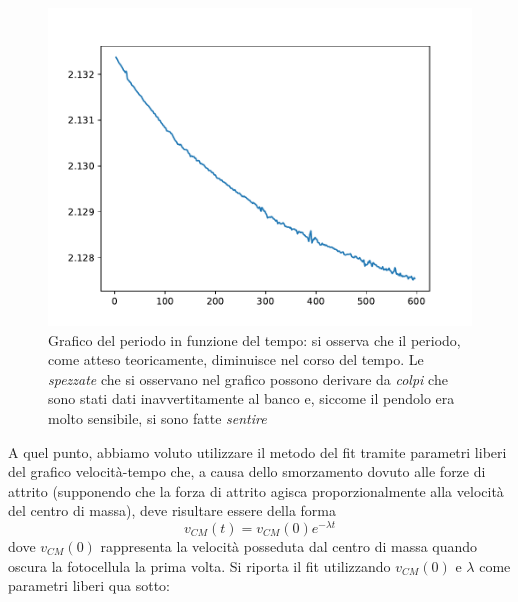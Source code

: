 \documentclass{article}
\begin{document}
\begin{figure}[htpb]
	\centering
	\includegraphics[scale=0.80]{Grafico_periodo_tempo.pdf}
	\caption{Grafico del periodo in funzione del tempo: si osserva che il periodo, come atteso teoricamente, diminuisce nel corso del tempo. Le \emph{spezzate} che si osservano nel grafico possono derivare da \emph{colpi} che sono stati dati inavvertitamente al banco e, siccome il pendolo era molto sensibile, si sono fatte \emph{sentire} }
\end{figure}
A quel punto, abbiamo voluto utilizzare il metodo del fit tramite parametri liberi del grafico velocità-tempo che, a causa dello smorzamento dovuto alle forze di attrito (supponendo che la forza di attrito agisca proporzionalmente alla velocità del centro di massa), deve risultare essere della forma
\begin{equation}
	v_{CM} (t) = v_{CM} (0) e^{-\lambda t}
\end{equation}
dove $v_{CM}(0)$ rappresenta la velocità posseduta dal centro di massa quando oscura la fotocellula la prima volta. Si riporta il fit utilizzando $v_{CM} (0)$ e $\lambda$ come parametri liberi qua sotto:
\end{document}
